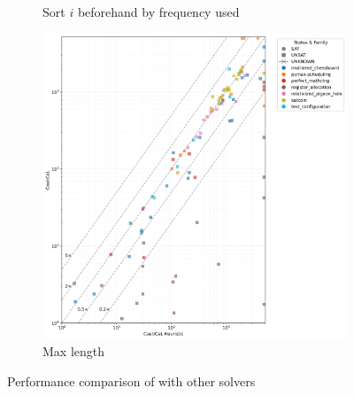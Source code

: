 \begin{figure}[!t]
\begin{subfigure}[t]{0.3\textwidth}
        \caption{Sort $i$ beforehand by frequency used}
        \label{fig:cautical-vs-prelearn}
    \end{subfigure}
    \begin{subfigure}[t]{0.3\textwidth}
        \centering
        \includegraphics[width=\textwidth]{figs/globalmaxlen_heuristic_comparison.jpg}
        \caption{Max length}
        \label{fig:cautical-vs-prelearn}
    \end{subfigure}

    \caption{Performance comparison of \tool with other solvers}
    \label{fig:solver-comparison}
\end{figure}

